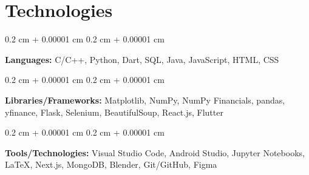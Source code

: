 \documentclass[10pt, letterpaper]{article}
\newenvironment{onecolentry}{
    \begin{adjustwidth}{
        0.2 cm + 0.00001 cm
    }{
        0.2 cm + 0.00001 cm
    }
}{
    \end{adjustwidth}
} %
\begin{document}
    
    \section{Technologies}



        
        \begin{onecolentry}
            \textbf{Languages:} C/C++, Python, Dart, SQL, Java, JavaScript, HTML, CSS
        \end{onecolentry}

        \vspace{0.2 cm}

        \begin{onecolentry}
            \textbf{Libraries/Frameworks:} Matplotlib, NumPy, NumPy Financials, pandas, yfinance, Flask, Selenium, BeautifulSoup, React.js, Flutter
        \end{onecolentry}

        \vspace{0.2 cm}

        \begin{onecolentry}
            \textbf{Tools/Technologies:} Visual Studio Code, Android Studio, Jupyter Notebooks, LaTeX, Next.js, MongoDB, Blender, Git/GitHub, Figma
        \end{onecolentry}


    
\end{document}
